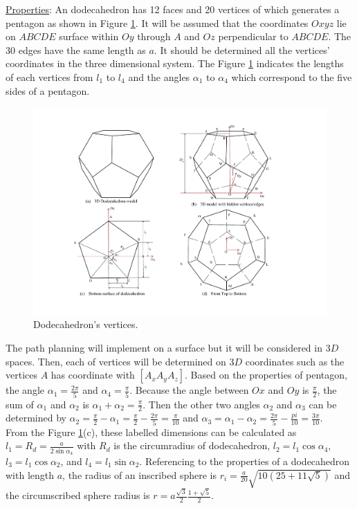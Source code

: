 \noindent\uline{Properties}: 
An dodecahedron has 12 faces and 20 vertices of which generates a pentagon as shown in Figure \ref{fig:dodecahedron2}.
It will be assumed that the coordinates $Oxyz$ lie on $ABCDE$ surface within $Oy$ through $A$ and $Oz$ perpendicular to $ABCDE$.
The 30 edges have the same length as $a$. It should be determined all the vertices' coordinates in the three dimensional system.
The Figure \ref{fig:dodecahedron2} indicates the lengths of each vertices from $l_1$ to $l_4$ and the angles $\alpha_1$ to $\alpha_4$ which correspond to the five sides of a pentagon.

\begin{figure}[h]
\centering
	\includegraphics[width=1\textwidth]{image/dodecahedron2.pdf}
	\caption{Dodecahedron's vertices.}
	\label{fig:dodecahedron2}
\end{figure}

The path planning will implement on a surface but it will be considered in $3D$ spaces. Then, each of vertices will be determined on $3D$ coordinates such as the vertices $A$ has coordinate with $[A_x A_y A_z]$. Based on the properties of pentagon, the angle $\alpha_1=\frac{2\pi}{5}$ and $\alpha_4=\frac{\pi}{5}$. Because the angle between $Ox$ and $Oy$ is $\frac{\pi}{2}$, the sum of $\alpha_1$ and $\alpha_2$ is $\alpha_1 + \alpha_2 = \frac{\pi}{2}$. Then the other two angles $\alpha_2$ and $\alpha_3$ can be determined by $\alpha_2 = \frac{\pi}{2}-\alpha_1 = \frac{\pi}{2}-\frac{2\pi}{5} = \frac{\pi}{10}$ and $\alpha_3 = \alpha_1-\alpha_2 = \frac{2\pi}{5}-\frac{pi}{10} = \frac{3\pi}{10}$.\\

From the Figure \ref{fig:dodecahedron2}(c), these labelled dimensions can be calculated as $l_1 = R_d = \frac{a}{2\sin{\alpha_4}}$ with $R_d$ is the circumradius of dodecahedron, $l_2 = l_1\cos{\alpha_4}$, $l_3 = l_1\cos{\alpha_2}$, and $l_4 = l_1\sin{\alpha_2}$. Referencing to the properties of a dodecahedron with length $a$, the radius of an inscribed sphere is $r_i = \frac{a}{20}\sqrt{10(25+11\sqrt{5})}$ and the circumscribed sphere radius is $r = a\frac{\sqrt{3}}{2}\frac{1+\sqrt{5}}{2}$.\\


